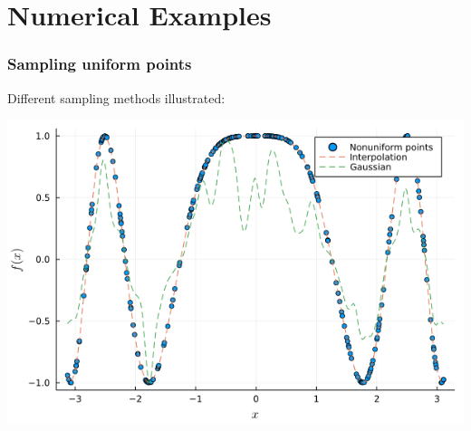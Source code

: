 \documentclass{beamer}
\begin{document}

\section{Numerical Examples}

\begin{frame}
    \sectionpage
\end{frame}

\begin{frame}
  \frametitle{Sampling uniform points}
  Different sampling methods illustrated:

  \vfill

  \centering \includegraphics[width=.8\textwidth]{images/conv_vs_interp.png}
\end{frame}
\end{document}
